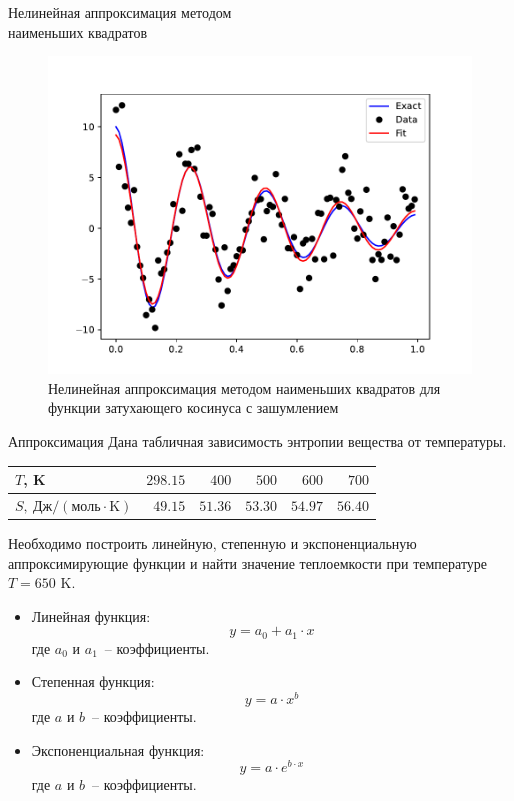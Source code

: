 \documentclass[aspectratio=169, mathserif]{beamer}	%
\begin{document}
\begin{frame}[fragile, label=c]{Нелинейная аппроксимация методом \\ наименьших квадратов}
\scriptsize
\begin{figure}[h!]
	\centering
	\includegraphics[width=.6\textwidth]{./pics/Figure_39.pdf}
	\caption{Нелинейная аппроксимация методом наименьших квадратов для функции затухающего косинуса с зашумлением}
	\label{fig:figure_39}
\end{figure}
\vfill
\end{frame}

\begin{frame}[fragile]{Аппроксимация}
\scriptsize
Дана табличная зависимость энтропии вещества от температуры.
\begin{table}[h!]
	\centering
	\begin{tabular}{|l|r|r|r|r|r|}
		\hline
		$T$, K & $298.15$ & $400$ & $500$ & $600$ & $700$ \\
		\hline
		$S,\ \mathrm{Дж/(моль \cdot K)}$ & $49.15$ & $51.36$ & $53.30$ & $54.97$ & $56.40$ \\
		\hline
	\end{tabular}
\end{table}
Необходимо построить линейную, степенную и экспоненциальную аппроксимирующие функции и найти значение теплоемкости при температуре $T=650$ K.
\vfill
\begin{itemize}
\item Линейная функция:
$$
	y = a_0 + a_1 \cdot x
$$
где $a_0$ и $a_1$~-- коэффициенты.
\item Степенная функция:
$$
	y = a \cdot x ^ b
$$
где $a$ и $b$~-- коэффициенты.
\item Экспоненциальная функция:
$$
	y = a \cdot e^ {b \cdot x}
$$
где $a$ и $b$~-- коэффициенты.
\end{itemize}
\vfill
\end{frame}
\end{document}
